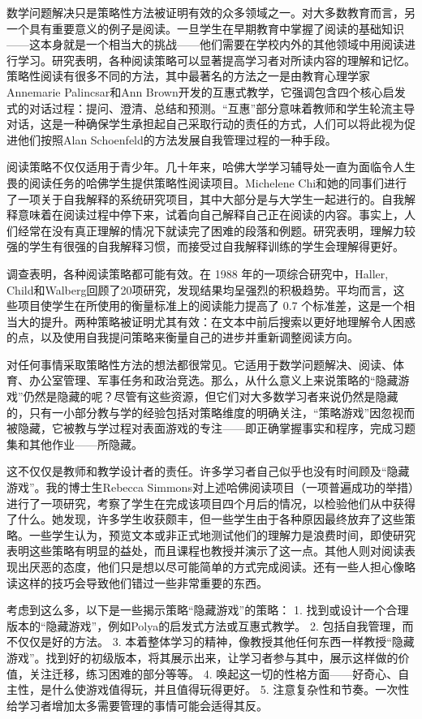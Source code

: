 数学问题解决只是策略性方法被证明有效的众多领域之一。对大多数教育而言，另一个具有重要意义的例子是阅读。一旦学生在早期教育中掌握了阅读的基础知识——这本身就是一个相当大的挑战——他们需要在学校内外的其他领域中用阅读进行学习。研究表明，各种阅读策略可以显著提高学习者对所读内容的理解和记忆。策略性阅读有很多不同的方法，其中最著名的方法之一是由教育心理学家Annemarie Palincsar和Ann Brown开发的互惠式教学，它强调包含四个核心启发式的对话过程：提问、澄清、总结和预测。“互惠”部分意味着教师和学生轮流主导对话，这是一种确保学生承担起自己采取行动的责任的方式，人们可以将此视为促进他们按照Alan Schoenfeld的方法发展自我管理过程的一种手段。

阅读策略不仅仅适用于青少年。几十年来，哈佛大学学习辅导处一直为面临令人生畏的阅读任务的哈佛学生提供策略性阅读项目。Michelene Chi和她的同事们进行了一项关于自我解释的系统研究项目，其中大部分是与大学生一起进行的。自我解释意味着在阅读过程中停下来，试着向自己解释自己正在阅读的内容。事实上，人们经常在没有真正理解的情况下就读完了困难的段落和例题。研究表明，理解力较强的学生有很强的自我解释习惯，而接受过自我解释训练的学生会理解得更好。

调查表明，各种阅读策略都可能有效。在 1988 年的一项综合研究中，Haller, Child和Walberg回顾了20项研究，发现结果均呈强烈的积极趋势。平均而言，这些项目使学生在所使用的衡量标准上的阅读能力提高了 0.7 个标准差，这是一个相当大的提升。两种策略被证明尤其有效：在文本中前后搜索以更好地理解令人困惑的点，以及使用自我提问策略来衡量自己的进步并重新调整阅读方向。

对任何事情采取策略性方法的想法都很常见。它适用于数学问题解决、阅读、体育、办公室管理、军事任务和政治竞选。那么，从什么意义上来说策略的“隐藏游戏”仍然是隐藏的呢？尽管有这些资源，但它们对大多数学习者来说仍然是隐藏的，只有一小部分教与学的经验包括对策略维度的明确关注，“策略游戏”因忽视而被隐藏，它被教与学过程对表面游戏的专注——即正确掌握事实和程序，完成习题集和其他作业——所隐藏。

这不仅仅是教师和教学设计者的责任。许多学习者自己似乎也没有时间顾及“隐藏游戏”。我的博士生Rebecca Simmons对上述哈佛阅读项目（一项普遍成功的举措）进行了一项研究，考察了学生在完成该项目四个月后的情况，以检验他们从中获得了什么。她发现，许多学生收获颇丰，但一些学生由于各种原因最终放弃了这些策略。一些学生认为，预览文本或非正式地测试他们的理解力是浪费时间，即使研究表明这些策略有明显的益处，而且课程也教授并演示了这一点。其他人则对阅读表现出厌恶的态度，他们只是想以尽可能简单的方式完成阅读。还有一些人担心像略读这样的技巧会导致他们错过一些非常重要的东西。

考虑到这么多，以下是一些揭示策略“隐藏游戏”的策略：
1.	找到或设计一个合理版本的“隐藏游戏”，例如Polya的启发式方法或互惠式教学。
2.	包括自我管理，而不仅仅是好的方法。
3.	本着整体学习的精神，像教授其他任何东西一样教授“隐藏游戏”。找到好的初级版本，将其展示出来，让学习者参与其中，展示这样做的价值，关注迁移，练习困难的部分等等。
4.	唤起这一切的性格方面——好奇心、自主性，是什么使游戏值得玩，并且值得玩得更好。
5.	注意复杂性和节奏。一次性给学习者增加太多需要管理的事情可能会适得其反。

